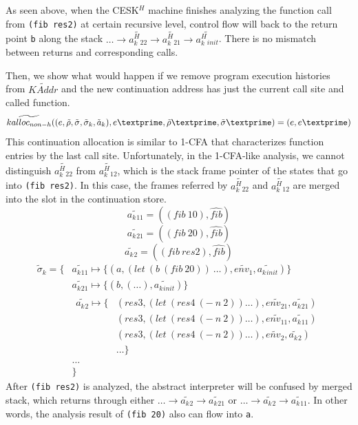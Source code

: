\documentclass[12pt]{report}
\begin{document}
As seen above, when the CESK$^H$ machine finishes analyzing the function call from \verb|(fib res2)| at certain recursive level, control flow will back to the return point \verb|b| along the stack $\dots \to \widetilde{a^H_k{}_{22}} \to \widetilde{a^H_k{}_{21}} \to \widetilde{a^H_k{}_{init}}$. There is no mismatch between returns and corresponding calls.

Then, we show what would happen if we remove program execution histories from $\widetilde{KAddr}$ and
the new continuation address has just the current call site and called function.
\[
\widetilde{kalloc_{non-h}} ((e, \tilde{\rho}, \tilde{\sigma}, \tilde{\sigma}_k, \tilde{a}_k), e\textprime, \tilde{\rho}\textprime, \tilde{\sigma}\textprime) =
(e, e\textprime)
\]
This continuation allocation is similar to 1-CFA that characterizes function entries by the last call site.
Unfortunately, in the 1-CFA-like analysis, we cannot distinguish $\widetilde{a^H_k{}_{22}}$ from $\widetilde{a^H_k{}_{12}}$, which is the stack frame pointer of the states that go into \verb|(fib res2)|.
In this case, the frames referred by $\widetilde{a^H_k{}_{22}}$ and $\widetilde{a^H_k{}_{12}}$ are merged into the slot in the continuation store.
\[
\widetilde{a_k{}_{11}} = ((fib\ 10), \widehat{fib})
\]
\[
\widetilde{a_k{}_{21}} = ((fib\ 20), \widehat{fib})
\]
\[
\widetilde{a_k{}_{2}} = ((fib\ res2), \widehat{fib})
\]
\[
\begin{aligned}
\tilde{\sigma}_k = \{ {}& \widetilde{a_k{}_{11}} \mapsto \{(a, (let\ (b\ (fib\ 20))\ \dots), \widetilde{env_1}, \widetilde{a_k{}_{init}})\}  {} \\
                            & \widetilde{a_k{}_{21}} \mapsto \{(b, (\dots), \widetilde{a_k{}_{init}}) \} {}\\
                            &
                            \begin{aligned}
                              \widetilde{a_k{}_{2}} \mapsto
                              \{{}& (res3, (let\ (res4\ (-\ n\ 2)) \dots), \widetilde{env_{21}}, \widetilde{a_k{}_{21}}) {}\\
                              & (res3, (let\ (res4\ (-\ n\ 2)) \dots), \widetilde{env_{11}}, \widetilde{a_k{}_{11}}) {}\\
                              & (res3, (let\ (res4\ (-\ n\ 2)) \dots), \widetilde{env_2}, \widetilde{a_k{}_{2}}) {} \\
                              & \dots
                              \}
                            \end{aligned} {}\\
                            & \dots {}\\
                            & \}
\end{aligned}
\]
After \verb|(fib res2)| is analyzed, the abstract interpreter will be confused by merged stack, which returns through either $\dots \to \widetilde{a_k{}_{2}} \to \widetilde{a_k{}_{21}}$ or $\dots \to \widetilde{a_k{}_{2}} \to \widetilde{a_k{}_{11}}$.
In other words, the analysis result of \verb|(fib 20)| also can flow into \verb|a|.
\end{document}
